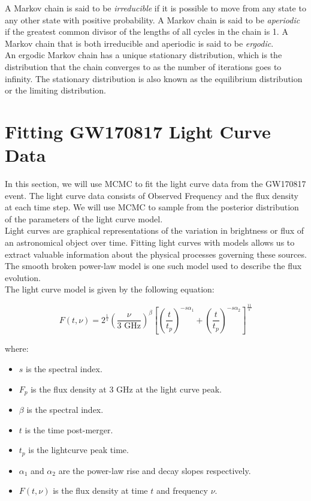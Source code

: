A Markov chain is said to be \textit{irreducible} if it is possible to move from any state to any other state with positive probability. A Markov chain is said to be \textit{aperiodic} if the greatest common divisor of the lengths of all cycles in the chain is 1. A Markov chain that is both irreducible and aperiodic is said to be \textit{ergodic}. \\

An ergodic Markov chain has a unique stationary distribution, which is the distribution that the chain converges to as the number of iterations goes to infinity. The stationary distribution is also known as the equilibrium distribution or the limiting distribution. \\

\section{Fitting GW170817 Light Curve Data}

In this section, we will use MCMC to fit the light curve data from the GW170817 event. The light curve data consists of Observed Frequency and the flux density at each time step. We will use MCMC to sample from the posterior distribution of the parameters of the light curve model. \\

Light curves are graphical representations of the variation in brightness or flux of an astronomical object over time. Fitting light curves with models allows us to extract valuable information about the physical processes governing these sources. The smooth broken power-law model is one such model used to describe the flux evolution. \\

The light curve model is given by the following equation:

\begin{equation}
	F(t, \nu) = 2 ^ {\frac{1}{s}} \left(\dfrac{\nu}{3 \text{ GHz}}\right) ^ \beta \left[\left(\dfrac{t}{t_p} \right)^{-s \alpha_1} + \left(\dfrac{t}{t_p} \right)^{-s \alpha_2}\right] ^ {\frac{11}{s}}
	\label{eq:smooth_broken_power_law}
\end{equation}

where:

\begin{itemize}
	\item $s$ is the spectral index.
	\item $F_p$ is the flux density at $3$ GHz at the light curve peak.
	\item $\beta$ is the spectral index.
	\item $t$ is the time post-merger.
	\item $t_p$ is the lightcurve peak time.
	\item $\alpha_1$ and $\alpha_2$ are the power-law rise and decay slopes respectively.
	\item $F(t, \nu)$ is the flux density at time $t$ and frequency $\nu$.
\end{itemize}

